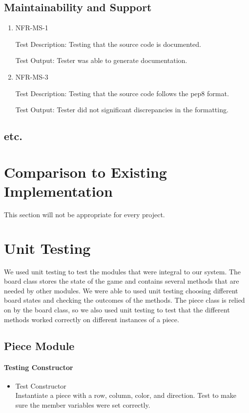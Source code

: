 \documentclass[12pt, titlepage]{article}
\begin{document}
\subsection{Maintainability and Support}
\begin{enumerate}
    \item {NFR-MS-1}
    \label{NFR-MS-1}    
    
    Test Description: Testing that the source code is documented.
    
    Test Output: Tester was able to generate documentation.
    \item {NFR-MS-3}
    \label{NFR-MS-3}    
    
    Test Description: Testing that the source code follows the pep8 format.
    
    Test Output: Tester did not significant discrepancies in the formatting.
\end{enumerate}

\subsection{etc.}
	
\section{Comparison to Existing Implementation}	

This section will not be appropriate for every project.

\section{Unit Testing}
We used unit testing to test the modules that were integral to our system. The board class stores the state of the game and contains several methods that are needed by other modules. We were able to used unit testing choosing different board states and checking the outcomes of the methods. The piece class is relied on by the board class, so we also used unit testing to test that the different methods worked correctly on different instances of a piece.

\subsection{Piece Module}
\paragraph{Testing Constructor}
\begin{itemize}
    \item{}Test Constructor\\
    Instantiate a piece with a row, column, color, and direction. Test to make sure the member variables were set correctly.
\end{itemize}
\end{document}
